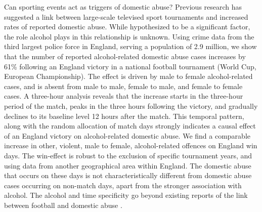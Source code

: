\documentclass[12pt, letterpaper]{article}
\newcommand{\NS}[1] {{\textcolor{green}{#1}}}
\begin{document}

Can sporting events act as triggers of domestic abuse? Previous research has suggested a link between large-scale televised sport tournaments and increased rates of reported domestic abuse\autocite{Card2011,Kirby2014}. While hypothesized to be a significant factor, the role alcohol plays in this relationship is unknown. Using crime data from the third largest police force in England, serving a population of 2.9 million\autocite{populationfigure}, we show that the number of reported alcohol-related domestic abuse cases increases by 61\% following an England victory in a national football tournament (World Cup, European Championship). The effect is driven by male to female alcohol-related cases, and is absent from male to male, female to male, and female to female cases. A three-hour analysis reveals that the increase starts in the three-hour period of the match, peaks in the three hours following the victory, and gradually declines to its baseline level 12 hours after the match. This temporal pattern, along with the random allocation of match days strongly indicates a causal effect of an England victory on alcohol-related domestic abuse. We find a comparable increase in other, violent, male to female, alcohol-related offences on England win days.  The win-effect is robust to the exclusion of specific tournament years, and using data from another geographical area within England. The domestic abuse that occurs on these days is not characteristically different from domestic abuse cases occurring on non-match days, apart from the stronger association with alcohol. The alcohol and time specificity go beyond existing reports of the link between football and domestic abuse \autocite{Kirby2014,Brimicombe2012}. 
\end{document}
